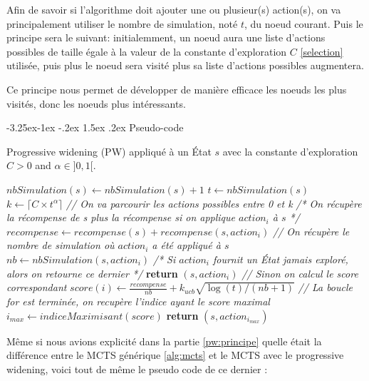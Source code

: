\documentclass[pdftex,french, english]{article}	%
\makeatletter
\newcounter {subsubsubsection}[subsubsection]
\newcommand\subsubsubsection{\@startsection{subsubsubsection}{4}{\z@}%
                                     {-3.25ex\@plus -1ex \@minus -.2ex}%
                                     {1.5ex \@plus .2ex}%
                                     {\normalfont\normalsize\bfseries}}
\makeatother
\begin{document}
		Afin de savoir si l'algorithme doit ajouter une ou plusieur(s) action(s), on va principalement utiliser le nombre de simulation, noté $t$, du noeud courant.
		Puis le principe sera le suivant: initialemment, un noeud aura une liste d'actions possibles de taille égale à la valeur de la constante d'exploration $C$ \ref{selection} utilisée, puis plus le noeud sera visité plus sa liste d'actions possibles augmentera.

		Ce principe nous permet de développer de manière efficace les noeuds les plus visités, donc les noeuds plus intéressants.

		\subsubsubsection{Pseudo-code} \label{pw:code}

		\begin{algorithm}[H]
			\caption{Progressive widening (PW) appliqué à un État $s$ avec la constante d'exploration $C > 0$ and $\alpha \in ]0, 1[$.}
			\label{alg:spw}
				\begin{algorithmic}[1]
						\State $nbSimulation(s) \gets nbSimulation(s) + 1$ 
						\State $t \gets nbSimulation(s)$
						\State $k \gets \lceil{C \times t^{\alpha}}\rceil$
						\State \textit{// On va parcourir les actions possibles entre 0 et k}
							\State \textit{/* On récupère la récompense de s plus la récompense si on applique $action_{i}$ à $s$ */}
							\State $recompense \gets recompense(s) + recompense(s, action_{i})$
							\State \textit{// On récupère le nombre de simulation où $action_{i}$ a été appliqué à $s$}
							\State $nb \gets nbSimulation(s, action_{i})$
								\State \textit{/* Si $action_{i}$ fournit un État jamais exploré, alors on retourne ce dernier */}
								\State \textbf{return} $(s, action_{i})$
							\Else
								\State \textit{// Sinon on calcul le score correspondant}
								\State $score(i) \gets \frac{recompense}{nb} + \textbf{$k_{ucb}$}\sqrt{\log(t)/(nb + 1)}$							
							\EndIf
						\EndFor
						\State \textit{// La boucle for est terminée, on recupère l'indice ayant le score maximal}
						\State $i_{max} \gets indiceMaximisant(score)$
						\State \textbf{return} $(s, action_{i_{max}})$
					\EndFunction
				\end{algorithmic}
		\end{algorithm}

		Même si nous avions explicité dans la partie \ref{pw:principe} quelle était la différence entre le MCTS générique \ref{alg:mcts} et le MCTS avec le progressive widening, voici tout de même le pseudo code de ce dernier :
\end{document}
